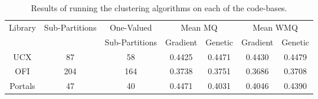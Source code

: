 \begin{table*}[ht]
    \centering
    \caption{Results of running the clustering algorithms on each of the code-bases.}
    \begin{tabular}{|c|c|c|c|c|c|c|}
        \hline
             \multirow{2}{*}{Library} & \multirow{2}{*}{Sub-Partitions} & One-Valued & \multicolumn{2}{c|}{Mean MQ} & \multicolumn{2}{c|}{Mean WMQ} \\
        \cline{4-7}
            & & Sub-Partitions & Gradient & Genetic & Gradient & Genetic \\
        \hline
        \hline
            UCX & 87 & 58 & 0.4425 & 0.4471 & 0.4430 & 0.4479 \\
        \hline
            OFI & 204 & 164 & 0.3738 & 0.3751 & 0.3686 & 0.3708 \\
        \hline
            Portals & 47 & 40 & 0.4471 & 0.4031 & 0.4046 & 0.4390 \\
        \hline
    \end{tabular}
    \label{tab:mq_results}
\end{table*}
